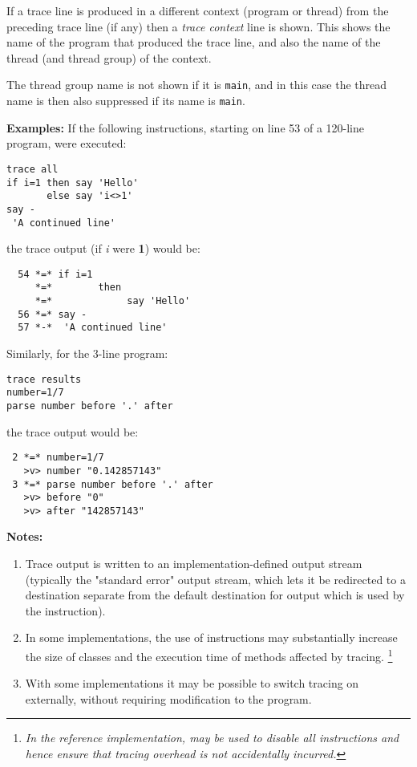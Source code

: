 If a trace line is produced in a different context (program or thread)
from the preceding trace line (if any) then a \emph{trace context}
line is shown.  This shows the name of the program that produced the
trace line, and also the name of the thread (and thread group) of the
context.
 
The thread group name is not shown if it is \texttt{main}, and in this
case the thread name is then also suppressed if its name is \texttt{main}.
 
\textbf{Examples:}
 If the following instructions, starting on line 53 of a 120-line
program, were executed:
\begin{lstlisting}
trace all
if i=1 then say 'Hello'
       else say 'i<>1'
say -
 'A continued line'
\end{lstlisting}
the trace output (if \emph{i} were \textbf{1}) would be:
\begin{lstlisting}
  54 *=* if i=1
     *=*        then
     *=*             say 'Hello'
  56 *=* say -
  57 *-*  'A continued line'
\end{lstlisting}
 Similarly, for the 3-line program:
\begin{lstlisting}
trace results
number=1/7
parse number before '.' after
\end{lstlisting}
the trace output would be:
\begin{lstlisting}
 2 *=* number=1/7
   >v> number "0.142857143"
 3 *=* parse number before '.' after
   >v> before "0"
   >v> after "142857143"
\end{lstlisting}
 \textbf{Notes:}
\begin{enumerate}
\item 
Trace output is written to an implementation-defined output stream
(typically the "standard error" output stream, which lets it be
redirected to a destination separate from the default destination for
output which is used by the  instruction).
\item In some implementations, the use of  instructions
may substantially increase the size of classes and the execution time of
methods affected by tracing.
\footnote{
\emph{In the reference implementation,  may be
used to disable all  instructions and hence ensure that
tracing overhead is not accidentally incurred.}
}
\item With some implementations it may be possible to switch tracing on
externally, without requiring modification to the program.
\end{enumerate}
